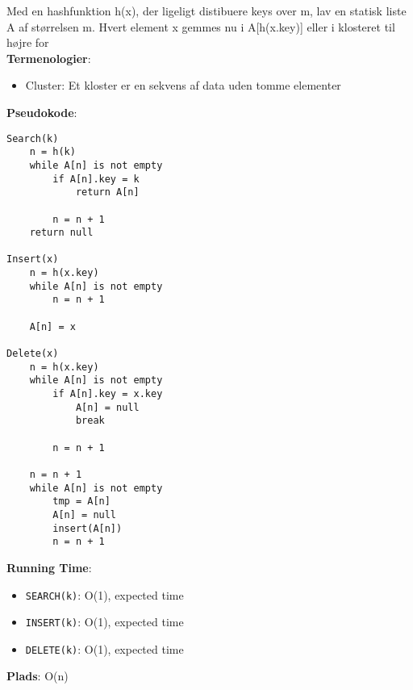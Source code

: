 Med en hashfunktion h(x), der ligeligt distibuere keys over m, lav en statisk liste A af størrelsen m. Hvert element x gemmes nu i A[h(x.key)] eller i klosteret til højre for\\
\textbf{Termenologier}:
\begin{itemize}
	\item Cluster: Et kloster er en sekvens af data uden tomme elementer
\end{itemize}
\textbf{Pseudokode}:
\begin{lstlisting}[frame=single, mathescape=true]
Search(k)
	n = h(k)
	while A[n] is not empty
		if A[n].key = k
			return A[n]
		
		n = n + 1
	return null

Insert(x)
	n = h(x.key)
	while A[n] is not empty
		n = n + 1
	
	A[n] = x

Delete(x)
	n = h(x.key)
	while A[n] is not empty
		if A[n].key = x.key
			A[n] = null
			break
		
		n = n + 1

	n = n + 1
	while A[n] is not empty
		tmp = A[n]
		A[n] = null
		insert(A[n])
		n = n + 1
\end{lstlisting}
\textbf{Running Time}:
\begin{itemize}
	\item \texttt{SEARCH(k)}: O(1), expected time
	\item \texttt{INSERT(k)}: O(1), expected time
	\item \texttt{DELETE(k)}: O(1), expected time
\end{itemize}
\textbf{Plads}: O(n)